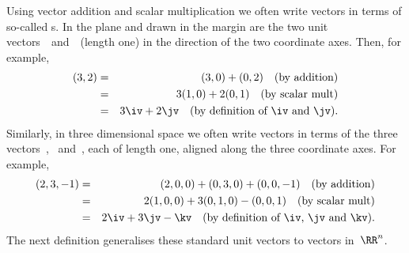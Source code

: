 Using vector addition and scalar multiplication we often write vectors in terms of so-called s.
In the plane and drawn in the margin are the two unit vectors~\iv\ and~\jv\ (length one) in the direction of the two coordinate axes.
%
Then, for example,
\begin{eqnarray*}
(3,2)&=&(3,0)+(0,2)\quad(\text{by addition})
\\&=&3(1,0)+2(0,1)\quad(\text{by scalar mult})
\\&=&3\iv+2\jv \quad(\text{by definition of \iv\ and \jv}).
\end{eqnarray*}
Similarly, in three dimensional space we often write vectors in terms of the three vectors~\iv, \jv\ and~\kv, each of length one, aligned along the three coordinate axes.
For example,
\begin{eqnarray*}
(2,3,-1)&=&(2,0,0)+(0,3,0)+(0,0,-1)\quad(\text{by addition})
\\&=&2(1,0,0)+3(0,1,0)-(0,0,1)\quad(\text{by scalar mult})
\\&=&2\iv+3\jv-\kv \quad(\text{by definition of \iv, \jv\ and \kv}).
\end{eqnarray*}
The next definition generalises these standard unit vectors to vectors in~\(\RR^n\).


